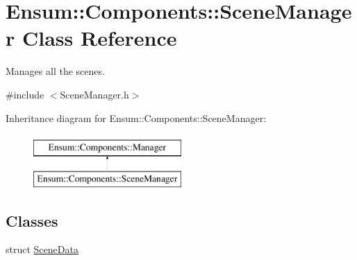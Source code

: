 \hypertarget{class_ensum_1_1_components_1_1_scene_manager}{}\section{Ensum\+:\+:Components\+:\+:Scene\+Manager Class Reference}
\label{class_ensum_1_1_components_1_1_scene_manager}


Manages all the scenes.  




{\ttfamily \#include $<$Scene\+Manager.\+h$>$}

Inheritance diagram for Ensum\+:\+:Components\+:\+:Scene\+Manager\+:\begin{figure}[H]
\begin{center}
\leavevmode
\includegraphics[height=2.000000cm]{class_ensum_1_1_components_1_1_scene_manager}
\end{center}
\end{figure}
\subsection*{Classes}
\begin{DoxyCompactItemize}
\item 
struct \hyperlink{struct_ensum_1_1_components_1_1_scene_manager_1_1_scene_data}{Scene\+Data}
\end{DoxyCompactItemize}

